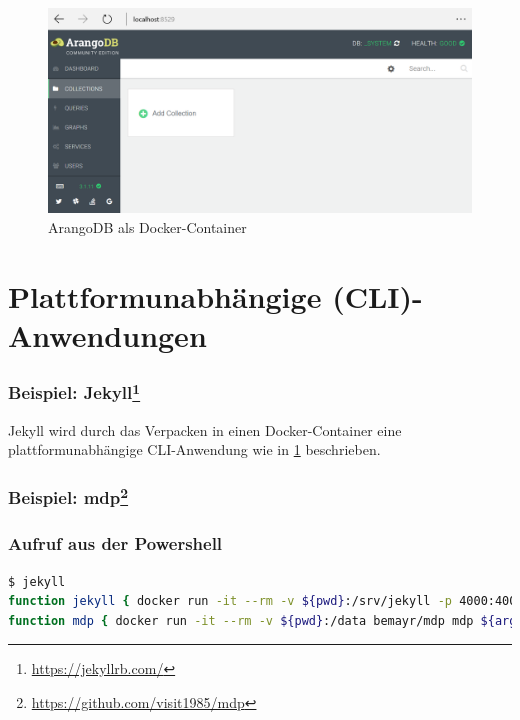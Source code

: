 \begin{figure}[htbp]
    \centering
    \includegraphics[width=0.8\linewidth,clip]{images/arangodb-demo}
    \caption{ArangoDB als Docker-Container}
\label{fig:arangodb-result}
\end{figure}

\section{Plattformunabhängige (CLI)-Anwendungen}
\label{sec:cross-platform-applications}

\subsubsection{Beispiel: Jekyll\protect\footnote{\url{https://jekyllrb.com/}}}

Jekyll wird durch das Verpacken in einen Docker-Container eine plattformunabhängige CLI-Anwendung wie in \cref{sec:cross-platform-applications} beschrieben.

\subsubsection{Beispiel: mdp\protect\footnote{\url{https://github.com/visit1985/mdp}}}




\subsubsection{Aufruf aus der Powershell}

\begin{lstlisting}[caption=Powershell-Funktionen für Docker-Kommandos, language=bash, label=lst:powershell-functions]
$ jekyll
function jekyll { docker run -it --rm -v ${pwd}:/srv/jekyll -p 4000:4000 jekyll/jekyll /usr/local/bin/jekyll ${args} }
function mdp { docker run -it --rm -v ${pwd}:/data bemayr/mdp mdp ${args} }
\end{lstlisting}

